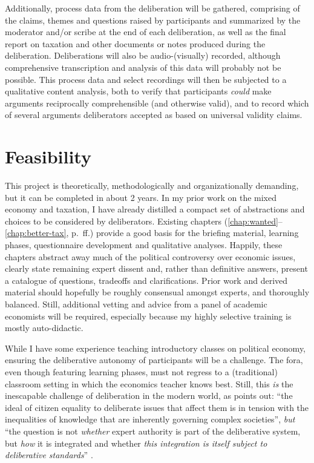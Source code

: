 Additionally, process data from the deliberation will be gathered, comprising of the claims, themes and questions raised by participants and summarized by the moderator and/or scribe at the end of each deliberation, as well as the final report on taxation and other documents or notes produced during the deliberation.
Deliberations will also be audio-(visually) recorded, although comprehensive transcription and analysis of this data will probably not be possible.
This process data and select recordings will then be subjected to a qualitative content analysis, both to verify that participants \emph{could} make arguments reciprocally comprehensible (and otherwise valid), and to record which of several arguments deliberators accepted as based on universal validity claims.

\section{Feasibility}
This project is theoretically, methodologically and organizationally demanding, but it can be completed in about 2 years.
In my prior work on the mixed economy and taxation, I have already distilled a compact set of abstractions and choices to be considered by deliberators.
Existing chapters (\ref{chap:wanted}--\ref{chap:better-tax}, p.~\pageref{chap:wanted}ff.) provide a good basis for the briefing material, learning phases, questionnaire development and qualitative analyses.
Happily, these chapters abstract away much of the political controversy over economic issues, clearly state remaining expert dissent and, rather than definitive answers, present a catalogue of questions, tradeoffs and clarifications.
Prior work and derived material should hopefully be roughly consensual amongst experts, and thoroughly balanced.
Still, additional vetting and advice from a panel of academic economists will be required, especially because my highly selective training is mostly auto-didactic.

While I have some experience teaching introductory classes on political economy, ensuring the deliberative autonomy of participants will be a challenge.
The fora, even though featuring learning phases, must not regress to a (traditional) classroom setting in which the economics teacher knows best.
Still, this \emph{is} the inescapable challenge of deliberation in the modern world, as \citeauthor{Moore2011} points out:
``the ideal of citizen equality to deliberate issues that affect them is in tension with the inequalities of knowledge that are inherently governing complex societies'', \emph{but} ``the question is not \emph{whether} expert authority is part of the deliberative system, but \emph{how} it is integrated and whether \emph{this integration is itself subject to deliberative standards}'' \citep[14, emphasis added]{Moore2011}.

